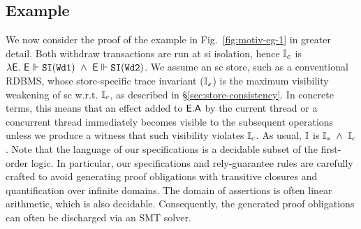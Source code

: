 \subsection{Example}

We now consider the proof of the example in Fig.~\ref{fig:motiv-eg-1}
in greater detail. Both withdraw transactions are run at {\sc si}
isolation, hence $\mathbb{I}_c$ is $\lambda\textsf{E}.~\textsf{E} \Vdash {\tt SI(Wd1)} ~\wedge~
\textsf{E} \Vdash {\tt SI(Wd2)}$. We assume an {\sc sc} store, such as a
conventional RDBMS, whose store-specific trace invariant ($\mathbb{I}_s$) is
the maximum visibility weakening of {\sc sc} w.r.t. $\mathbb{I}_c$, as
described in \S\ref{sec:store-consistency}. In concrete terms, this
means that an effect added to $\textsf{E}.\textsf{A}$ by the current thread or a
concurrent thread immediately becomes visible to the subsequent
operations unless we produce a witness that such visibility violates
$\mathbb{I}_c$. As usual, $\mathbb{I}$ is $\mathbb{I}_s ~\wedge~ \mathbb{I}_c$. Note that the language of
our specifications is a decidable subset of the first-order logic. In
particular, our specifications and rely-guarantee rules are carefully
crafted to avoid generating proof obligations with transitive closures
and quantification over infinite domains. The domain of assertions is
often linear arithmetic, which is also decidable. Consequently, the
generated proof obligations can often be discharged via an SMT solver.

